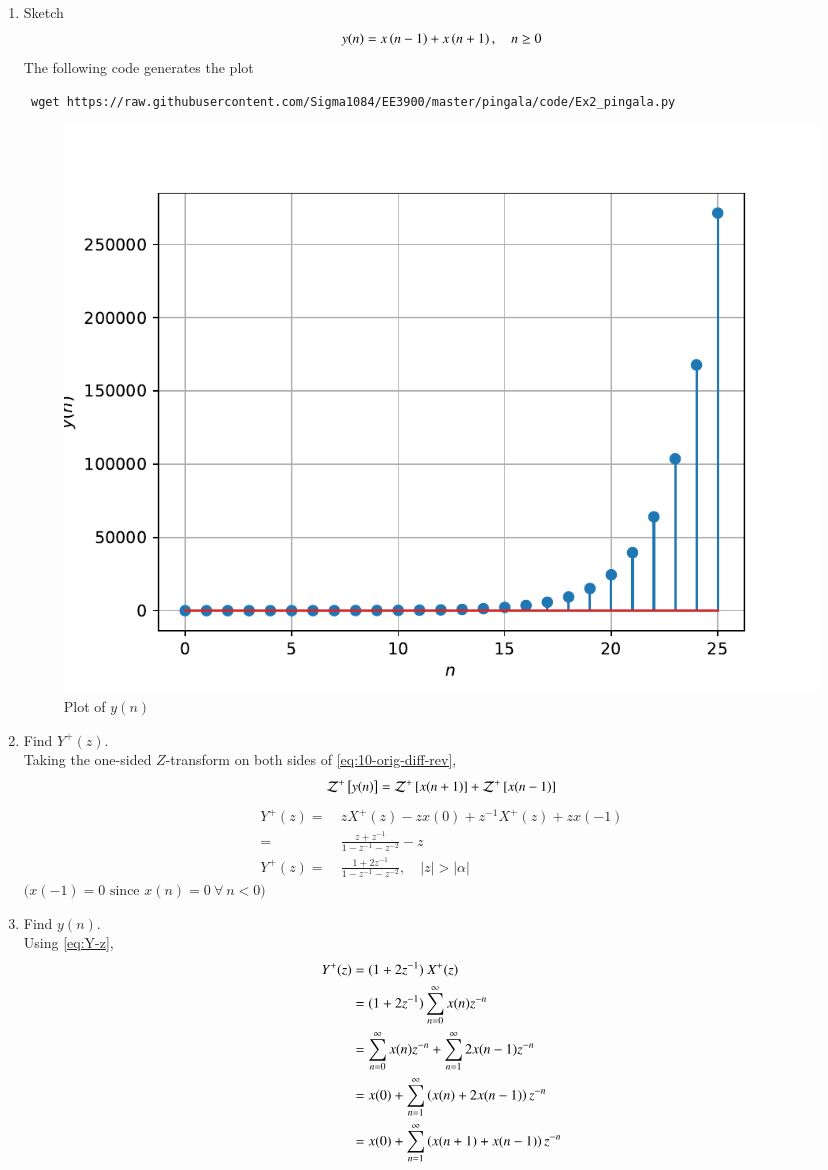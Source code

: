 \documentclass[journal,12pt,twocolumn]{IEEEtran}
\renewcommand\thesection{\arabic{section}}
\begin{document}
\begin{enumerate}[label=\thesection.\arabic*,ref=\thesection.\theenumi]
\item Sketch
	\begin{align}
		y(n) = x\left(n-1\right) + x\left(n+1\right), \quad n \ge 0
		\label{eq:10-orig-diff-rev}
 	\end{align}
	 \solution The following code generates the plot
	 \begin{lstlisting}
 wget https://raw.githubusercontent.com/Sigma1084/EE3900/master/pingala/code/Ex2_pingala.py
	 \end{lstlisting}
	 \begin{figure}[!htp]
		 \includegraphics[width=\columnwidth]{../figs/y_n.pdf}
		 \caption{Plot of $y(n)$}
		 \label{fig:y-n}
	 \end{figure}


\item Find $Y^{+}(z)$. \\
	\solution
	Taking the one-sided $Z$-transform on both sides of \eqref{eq:10-orig-diff-rev},
	\[
		\mathcal{Z}^+{}\left[y(n)\right] = \mathcal{Z}^+{}\left[x(n + 1)\right] + \mathcal{Z}^+{}\left[x(n - 1)\right]
	\]
	\begin{align}
		Y^+(z) =& \ zX^+(z) - zx(0) + z^{-1}X^+(z) + zx(-1) \nonumber \\
		=& \ \frac{z + z^{-1}}{1 - z^{-1} - z^{-2}} - z \nonumber \\
		Y^+(z) =& \ \frac{1 + 2z^{-1}}{1 - z^{-1} - z^{-2}}, \quad |z| > |\alpha| \label{eq:Y-z}
	\end{align}
	\ensuremath{\big( x(-1) = 0 \text{ since } x(n) = 0 \ \forall\ n < 0 \big)}

\item Find $y(n)$. \\
	\solution Using \eqref{eq:Y-z},
	\begin{align*}
		Y^+(z) &= (1 + 2z^{-1}) \ X^+(z) \\
			&= (1 + 2z^{-1})\sum_{n = 0}^{\infty}x(n)z^{-n} \\
			&= \sum_{n = 0}^{\infty}x(n)z^{-n} + \sum_{n = 1}^{\infty}2x(n - 1)z^{-n} \\
			&= x(0) + \sum_{n = 1}^{\infty}\left(x(n) + 2x(n - 1)\right)z^{-n} \\
			&= x(0) + \sum_{n = 1}^{\infty}\left(x(n + 1) + x(n - 1)\right)z^{-n}
	\end{align*}


\end{enumerate}
\end{document}
